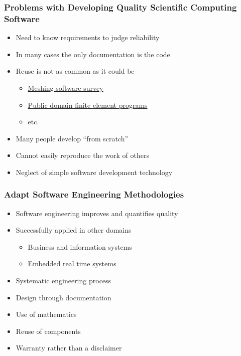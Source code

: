 \documentclass[t,12pt,numbers,fleqn]{beamer}
\begin{document}
\begin{frame}

\frametitle{Problems with Developing Quality Scientific Computing Software}

\begin{itemize}

\item Need to know requirements to judge reliability
\item In many cases the only documentation is the code
\item Reuse is not as common as it could be
\begin{itemize}
\item \href{http://www.andrew.cmu.edu/user/sowen/softsurv.html}{\alert{Meshing software survey}}
\item \href{http://www.engr.usask.ca/~macphed/finite/fe_resources/node137.html}{\alert{Public domain finite element
programs}}
\item etc.
\end{itemize}
\item Many people develop ``from scratch''
\item Cannot easily reproduce the work of others
\item Neglect of simple software development technology~\cite{Wilson2006} 

\end{itemize}

\end{frame}

\begin{frame}

\frametitle{Adapt Software Engineering Methodologies}

\begin{itemize}

\item Software engineering improves and quantifies quality %
\item Successfully applied in other domains
\begin{itemize}
\item Business and information systems
\item Embedded real time systems
\end{itemize}
\item Systematic engineering process
\item Design through documentation
\item Use of mathematics
\item Reuse of components
\item Warranty rather than a disclaimer %

\end{itemize}

\end{frame}
\end{document}
